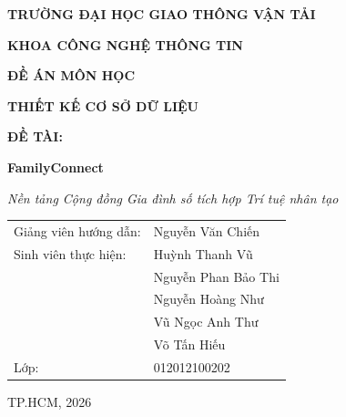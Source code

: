 \documentclass[11pt]{article}
\author{}
\date{}
\begin{document}
	
	\begin{titlepage}
		\centering
		\vspace*{0.5cm}
		{\bfseries\large TRƯỜNG ĐẠI HỌC GIAO THÔNG VẬN TẢI\par}
		\vspace{0.3cm}
		{\bfseries\large KHOA CÔNG NGHỆ THÔNG TIN\par}
		\vspace{2.5cm}
		{\bfseries\Large ĐỀ ÁN MÔN HỌC\par}
		\vspace{0.5cm}
		{\bfseries\Large THIẾT KẾ CƠ SỞ DỮ LIỆU\par}
		\vspace{1.5cm}
		{\bfseries\large ĐỀ TÀI:\par}
		\vspace{0.5cm}
		{\bfseries\huge FamilyConnect\par}
		\vspace{0.4cm}
		{\itshape\large Nền tảng Cộng đồng Gia đình số tích hợp Trí tuệ nhân tạo\par}
		\vspace{2cm}
		
		\begin{flushleft}
			\hspace{3cm}\begin{minipage}{12cm}
				\large
				\begin{tabular}{ll}
					Giảng viên hướng dẫn: & Nguyễn Văn Chiến \\[6pt]
					Sinh viên thực hiện:  & Huỳnh Thanh Vũ \\[4pt]
					                      & Nguyễn Phan Bảo Thi \\[4pt]
					                      & Nguyễn Hoàng Như \\[4pt]
					                      & Vũ Ngọc Anh Thư \\[4pt]
					                      & Võ Tấn Hiếu \\[6pt]
					Lớp:                  & 012012100202
				\end{tabular}
			\end{minipage}
		\end{flushleft}
		
		\vfill
		{\large TP.HCM, 2026\par}
	\end{titlepage}
	
	\begingroup
	\renewcommand{\textbf}[1]{#1}
	\renewcommand{\textit}[1]{#1}
	\tableofcontents
	\endgroup
	\newpage
	
	
	
	
	
	
\end{document}
